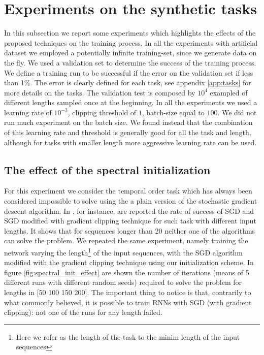 \section{Experiments on the synthetic tasks}
In this subsection we report some experiments which highlights the effects of the proposed techniques on the training process. In all the experiments with artificial dataset we employed a potentially infinite training-set, since we generate data on the fly. We used a validation set to determine the success of the training process. We define a training run to be successful if the error on the validation set if less than 1\%. The error is clearly defined for each task, see appendix \ref{app:tasks} for more details on the tasks. The validation test is composed by $10^4$ exampled of different lengths sampled once at the beginning. In all the experiments we used a learning rate of $10^{-3}$, clipping threshold of $1$, batch-size equal to $100$. We did not run much experiment on the batch size. We found instead that the combination of this learning rate and threshold is generally good for all the task and length, although for tasks with smaller length more aggressive learning rate can be used.

\subsection{The effect of the spectral initialization}

For this experiment we consider the temporal order task which has always been considered impossible to solve using the a plain version of the stochastic  gradient descent algorithm.
In \cite{advancesInOptimizingRnns}, for instance, are reported the rate of success of SGD and SGD modified with gradient clipping technique for such task with different input lengths. It shows that for sequences longer than 20 neither one of the algorithms can solve the problem. We repeated the same experiment, namely training the network varying the length\footnote{Here we refer as the length of the task to the minim length of the input sequences} of the input sequences, with the SGD algorithm modified with the gradient clipping technique using our initialization scheme. In figure \ref{fig:spectral_init_effect} are shown the number of iterations (means of 5 different runs with different random seeds) required to solve the problem for lengths in [50 100 150 200]. The important thing to notice is that, contrarily to what commonly believed, it is possible to train RNNs with SGD (with gradient clipping): not one of the runs for any length failed.

